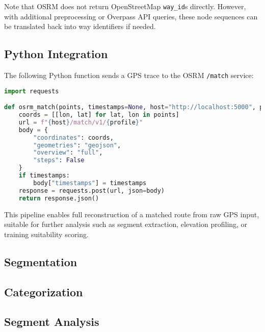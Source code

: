 \documentclass[12pt,a4paper]{report}
\begin{document}
Note that OSRM does not return OpenStreetMap \texttt{way\_id}s directly. However, with additional preprocessing or Overpass API queries, these node sequences can be translated back into way identifiers if needed.

\subsection{Python Integration}

The following Python function sends a GPS trace to the OSRM \texttt{/match} service:

\begin{lstlisting}[language=Python]
import requests

def osrm_match(points, timestamps=None, host="http://localhost:5000", profile="bicycle"):
    coords = [[lon, lat] for lat, lon in points]
    url = f"{host}/match/v1/{profile}"
    body = {
        "coordinates": coords,
        "geometries": "geojson",
        "overview": "full",
        "steps": False
    }
    if timestamps:
        body["timestamps"] = timestamps
    response = requests.post(url, json=body)
    return response.json()
\end{lstlisting}

This pipeline enables full reconstruction of a matched route from raw GPS input, suitable for further analysis such as segment extraction, elevation profiling, or training suitability scoring.



\subsection{Segmentation}
\subsection{Categorization}
\subsection{Segment Analysis}
\end{document}
